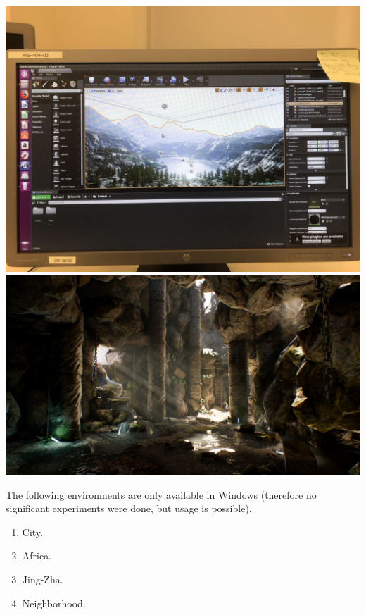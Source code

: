 \documentclass{article}
\begin{document}
 \includegraphics[scale=0.1]{environments/landscape.jpg}
 \includegraphics[scale=0.1]{environments/cave.png}

The following environments are only available in Windows
(therefore no significant experiments were done, but usage is possible).

\begin{enumerate}
    \item City.
    \item Africa.
    \item Jing-Zha.
    \item Neighborhood.
\end{enumerate}
\end{document}
